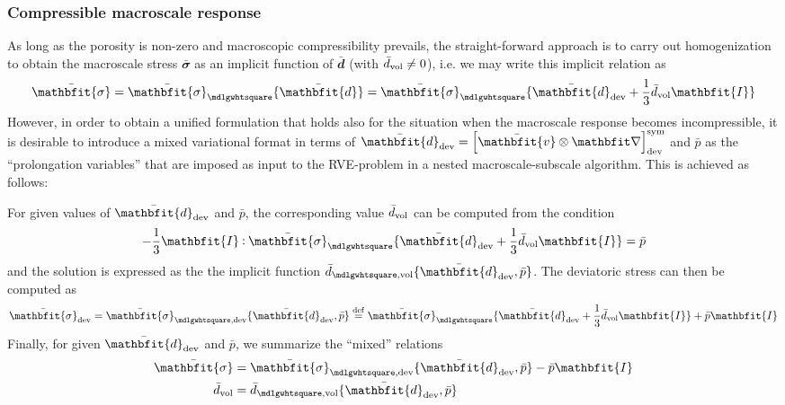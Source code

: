 \documentclass[12pt,a4paper,fleqn]{article}
\renewcommand{\ta}[1]{\mathbfit{#1}}
\renewcommand{\ts}[1]{\mathbfit{#1}}
\renewcommand{\Box}{\mdlgwhtsquare}
\begin{document}
\subsubsection{Compressible macroscale response}

As long as the porosity is non-zero and macroscopic compressibility prevails, the straight-forward approach is to carry out homogenization to obtain the macroscale stress $\bar{\ts\sigma}$ as an implicit function of $\bar{\ts d}$ (with $\bar{d}_{\mathrm{vol}}\neq 0$), i.e. we may write this implicit relation as
\begin{equation}
   \bar{\ts\sigma} = \bar{\ts\sigma}_\Box\{\bar{\ts d}\} = \bar{\ts\sigma}_\Box\{\bar{\ts d}_\dev +\frac13\bar{d}_\vol\ts I\}
\label{eq416a}
\end{equation}
However, in order to obtain a unified formulation that holds also for the situation when the macroscale response becomes incompressible, it is desirable to introduce a mixed variational format in terms of $\bar{\ts d}_\dev=\left[\bar{\ta v}\outerp\diff\right]^\sym_\dev$ and $\bar{p}$ as the ``prolongation variables'' that are imposed as input to the RVE-problem in a nested macroscale-subscale algorithm. This is achieved as follows:

For given values of $\bar{\ts d}_\dev$ and $\bar{p}$, the corresponding value $\bar{d}_{\mathrm{vol}}$ can be computed from the condition
\begin{equation}
    -\frac13 \ts I\dprod \bar{\ts\sigma}_\Box\{\bar{\ts d}_\dev +\frac13\bar{d}_\vol\ts I\} = \bar p
\label{eq416}
\end{equation}
and the solution is expressed as the the implicit function $\bar{d}_{\Box,\vol}\{\bar{\ts d}_\dev,\bar{p}\}$. The deviatoric stress can then be computed as
\begin{equation}
    \bar{\ts\sigma}_{\dev} = \bar{\ts\sigma}_{\Box,\dev}\{\bar{\ts d}_\dev,\bar p\} \defeq \bar{\ts\sigma}_\Box\{\bar{\ts d}_\dev + \frac13 \bar{d}_\vol\ts I\} + \bar{p}\ts{I}
\label{eq418}
\end{equation}
Finally, for given $\bar{\ts d}_\dev$ and $\bar{p}$, we summarize the ``mixed'' relations
\begin{align}
 \bar{\ts\sigma} & =  \bar{\ts\sigma}_{\Box,\dev}\{\bar{\ts d}_\dev,\bar p\} - \bar p\ts I
\label{eq418a}\\
 \bar{d}_\vol & =  \bar{d}_{\Box,\vol}\{\bar{\ts d}_\dev, \bar p\}
\label{eq418b}
\end{align}
\end{document}
